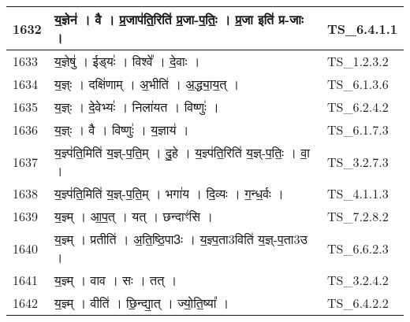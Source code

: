 \documentclass[17pt]{extarticle}
\begin{document}
\begin{longtable}{||p{0.4in}||p{4.9in}||p{0.9in}||}
    \hline
        
    1632 & य॒ज्ञेन॑   ।   वै   ।   प्र॒जाप॑ति॒रिति॑ प्र॒जा{-}प॒तिः॒   ।   प्र॒जा इति॑ प्र{-}जाः   ।    & TS\_6.4.1.1       \\
    
    \hline
        
    1633 & य॒ज्ञेषु॑   ।   ईड्‍यः॑   ।   विश्वे᳚   ।   दे॒वाः   ।    & TS\_1.2.3.2       \\
    
    \hline
        
    1634 & य॒ज्ञ्ः   ।   दक्षि॑णाम्   ।   अ॒भीति॑   ।   अ॒द्ध्या॒य॒त्   ।    & TS\_6.1.3.6       \\
    
    \hline
        
    1635 & य॒ज्ञ्ः   ।   दे॒वेभ्यः॑   ।   निला॑यत   ।   विष्णुः॑   ।    & TS\_6.2.4.2       \\
    
    \hline
        
    1636 & य॒ज्ञ्ः   ।   वै   ।   विष्णुः॑   ।   य॒ज्ञाय॑   ।    & TS\_6.1.7.3       \\
    
    \hline
        
    1637 & य॒ज्ञ्प॑ति॒मिति॑ य॒ज्ञ्{-}प॒ति॒म्   ।   दु॒हे   ।   य॒ज्ञ्प॑ति॒रिति॑ य॒ज्ञ्{-}प॒तिः॒   ।   वा॒   ।    & TS\_3.2.7.3       \\
    
    \hline
        
    1638 & य॒ज्ञ्प॑ति॒मिति॑ य॒ज्ञ्{-}प॒ति॒म्   ।   भगा॑य   ।   दि॒व्यः   ।   ग॒न्ध॒र्वः   ।    & TS\_4.1.1.3       \\
    
    \hline
        
    1639 & य॒ज्ञ्म्   ।   आ॒प॒त्   ।   यत्   ।   छन्दाꣳ॑सि   ।    & TS\_7.2.8.2       \\
    
    \hline
        
    1640 & य॒ज्ञ्म्   ।   प्रतीति॑   ।   अ॒ति॒ष्ठि॒पा3ः   ।   य॒ज्ञ्प॒ता3विति॑ य॒ज्ञ्{-}प॒ता3उ   ।    & TS\_6.6.2.3       \\
    
    \hline
        
    1641 & य॒ज्ञ्म्   ।   वाव   ।   सः   ।   तत्   ।    & TS\_3.2.4.2       \\
    
    \hline
        
    1642 & य॒ज्ञ्म्   ।   वीति॑   ।   छि॒न्द्या॒त्   ।   ज्यो॒ति॒ष्या᳚   ।    & TS\_6.4.2.2       \\
    

\end{longtable}
\end{document}
